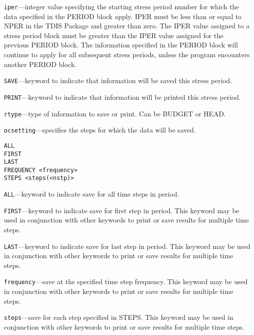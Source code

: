 \begin{description}
\item \texttt{iper}---integer value specifying the starting stress period number for which the data specified in the PERIOD block apply.  IPER must be less than or equal to NPER in the TDIS Package and greater than zero.  The IPER value assigned to a stress period block must be greater than the IPER value assigned for the previous PERIOD block.  The information specified in the PERIOD block will continue to apply for all subsequent stress periods, unless the program encounters another PERIOD block.

\item \texttt{SAVE}---keyword to indicate that information will be saved this stress period.

\item \texttt{PRINT}---keyword to indicate that information will be printed this stress period.

\item \texttt{rtype}---type of information to save or print.  Can be BUDGET or HEAD.

\item \texttt{ocsetting}---specifies the steps for which the data will be saved.

\begin{lstlisting}[style=blockdefinition]
ALL
FIRST
LAST
FREQUENCY <frequency>
STEPS <steps(<nstp)>
\end{lstlisting}

\item \texttt{ALL}---keyword to indicate save for all time steps in period.

\item \texttt{FIRST}---keyword to indicate save for first step in period. This keyword may be used in conjunction with other keywords to print or save results for multiple time steps.

\item \texttt{LAST}---keyword to indicate save for last step in period. This keyword may be used in conjunction with other keywords to print or save results for multiple time steps.

\item \texttt{frequency}---save at the specified time step frequency. This keyword may be used in conjunction with other keywords to print or save results for multiple time steps.

\item \texttt{steps}---save for each step specified in STEPS. This keyword may be used in conjunction with other keywords to print or save results for multiple time steps.

\end{description}

